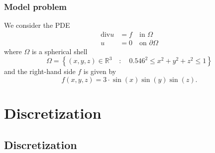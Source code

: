 \documentclass[t,compress=false,usepdftitle=false]{beamer}
\renewcommand{\div}{\mbox{div}}
\def\RR{\mathbb{R}}
\begin{document}
%
%
\begin{frame}\frametitle{Model problem}
We consider the PDE 
\begin{align*}
\div u &= f\quad \text{in }\Omega \\
     u &= 0\quad \text{on }\partial\Omega
\end{align*}
where $\Omega$ is a spherical shell
\begin{equation*}
\Omega = \left\{(x,y,z) \in\RR^3\quad:\quad 0.546^2 \leq x^2+y^2+z^2 \leq 1\right\}
\end{equation*}
and the right-hand side $f$ is given by
\begin{equation*}
f(x,y,z) = 3\cdot \sin(x)\sin(y)\sin(z).
\end{equation*}
%
\end{frame}
%
%
%
\section{Discretization}
\subsection{Discretization}
\end{document}
